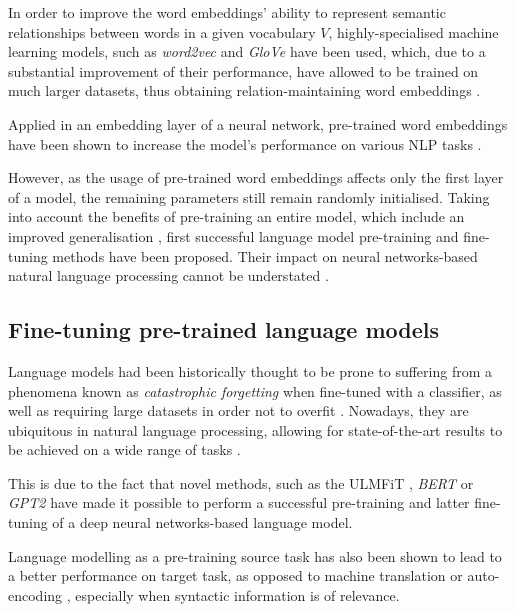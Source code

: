 In order to improve the word embeddings' ability to represent semantic relationships between words in a given vocabulary $V$, highly-specialised machine learning models, such as \emph{word2vec} and \emph{GloVe} have been used, which, due to a substantial improvement of their performance, have allowed to be trained on much larger datasets, thus obtaining relation-maintaining word embeddings \cite{embeddings:relations,word2vec,glove}. 

Applied in an embedding layer of a neural network, pre-trained word embeddings have been shown to increase the model's performance on various NLP tasks \cite{embeddings:accuracy,embeddings:accuracy2}.

However, as the usage of pre-trained word embeddings affects only the first layer of a model, the remaining parameters still remain randomly initialised. Taking into account the benefits of pre-training an entire model, which include an improved generalisation \cite{pretraining:benefits}, first successful language model pre-training and fine-tuning methods have been proposed. Their impact on neural networks-based natural language processing cannot be understated \cite{state_of_nlp_2019}.


\subsection{Fine-tuning pre-trained language models}
\label{finetuning:languagemodels}

Language models had been historically thought to be prone to suffering from a phenomena known as \emph{catastrophic forgetting} \cite{goodfellow:forgetting} when fine-tuned with a classifier, as well as requiring large datasets in order not to overfit \cite{dai:sequencelearning}. Nowadays, they are ubiquitous in natural language processing, allowing for state-of-the-art results to be achieved on a wide range of tasks \cite{state_of_nlp_2019}. 

This is due to the fact that novel methods, such as the ULMFiT \cite{ulmfit}, \emph{BERT} \cite{bert} or \emph{GPT2} \cite{gpt2} have made it possible to perform a successful pre-training and latter fine-tuning of a deep neural networks-based language model.

Language modelling as a pre-training source task has also been shown to lead to a better performance on target task, as opposed to machine translation or auto-encoding \cite{languagemodels:vstranslation}, especially when syntactic information is of relevance.


